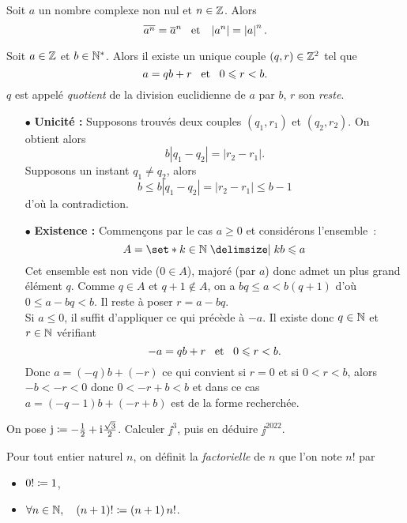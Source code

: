 \documentclass{magnolia}
\begin{document}
\begin{proposition}
Soit $a$ un nombre complexe non nul et $n\in\mathbb{Z}$. Alors
\[\overline{a^n}=\overline{a}^n \quad\!\text{et}\quad\! \left|a^n\right|=\left|a\right|^n.\]
\end{proposition}

\begin{definition}
Soit $a\in\mathbb{Z}$ et $b\in{\mathbb{N}^*}$. Alors il existe un unique couple $\left(q,r\right)\in\mathbb{Z}^2$
tel que
\[a=qb+r \quad\!\text{et}\quad\! 0\leqslant r<b.\]
$q$ est appelé \emph{quotient} de la division euclidienne de $a$ par $b$, $r$ son
\emph{reste}.
\end{definition}

\begin{preuve}
\begin{itemize}
\item[$\bullet$] \textbf{Unicité :} Supposons trouvés deux couples $(q_1,r_1)$ et $(q_2,r_2)$. On obtient alors $$b|q_1-q_2|=|r_2-r_1|.$$ Supposons un instant $q_1\neq q_2$, alors $$b\leq b|q_1-q_2|=|r_2-r_1|\leq b-1$$ d'où la contradiction.
\item[$\bullet$] \textbf{Existence :} Commençons par le cas $a\geq 0$ et considérons l'ensemble~:
\[A=\enstq{k\in\N}{kb\leq a}\]
Cet ensemble est non vide ($0\in A$), majoré (par $a$) donc admet un plus grand
élément $q$. Comme $q\in A$ et $q+1 \notin A$, on a $bq\leq a <b(q+1)$ d'où $0\leq a-bq<b$. Il reste à poser $r=a-bq$.\\
Si $a\leq 0$, il suffit d'appliquer ce qui précède à $-a$. Il existe donc $q\in \mathbb{N}$ et $r\in \mathbb{N}$ vérifiant \[-a=qb+r \quad\!\text{et}\quad\! 0\leqslant r<b.\]
Donc $a=(-q)b+(-r)$ ce qui convient si $r=0$ et si $0<r<b$, alors $-b<-r<0$ donc $0<-r+b<b$ et dans ce cas $a=(-q-1)b+(-r+b)$ est de la forme recherchée.
\end{itemize}
\end{preuve}

\begin{exoUnique}
\exo On pose ${\rm j}\coloneqq-\frac{1}{2}+{\rm i}\frac{\sqrt{3}}{2}$. Calculer $\jj^3$, puis en déduire
  $\jj^{2022}$.
\end{exoUnique}
  

\begin{definition}[utile=-3]
Pour tout entier naturel $n$, on définit la \emph{factorielle} de $n$ que l'on note
$n!$ par
\begin{itemize}
\item $0!\coloneqq 1$,
\item $\forall n\in\mathbb{N} ,\quad \left(n+1\right)!\coloneqq\left(n+1\right)n!$.
\end{itemize}
\end{definition}
\end{document}
